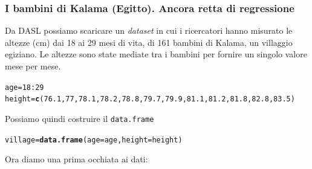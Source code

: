 \documentclass[onecolumn,12pt]{book}\usepackage[]{graphicx}\usepackage[]{color}
\makeatletter
\newcommand{\hlnum}[1]{\textcolor[rgb]{0.686,0.059,0.569}{#1}}%
\newcommand{\hlopt}[1]{\textcolor[rgb]{0,0,0}{#1}}%
\newcommand{\hlstd}[1]{\textcolor[rgb]{0.345,0.345,0.345}{#1}}%
\newcommand{\hlkwb}[1]{\textcolor[rgb]{0.69,0.353,0.396}{#1}}%
\newcommand{\hlkwc}[1]{\textcolor[rgb]{0.333,0.667,0.333}{#1}}%
\newcommand{\hlkwd}[1]{\textcolor[rgb]{0.737,0.353,0.396}{\textbf{#1}}}%
\newenvironment{kframe}{%
 \def\at@end@of@kframe{}%
 \ifinner\ifhmode%
  \def\at@end@of@kframe{\end{minipage}}%
  \begin{minipage}{\columnwidth}%
 \fi\fi%
 \def\FrameCommand##1{\hskip\@totalleftmargin \hskip-\fboxsep
 \colorbox{shadecolor}{##1}\hskip-\fboxsep
     \hskip-\linewidth \hskip-\@totalleftmargin \hskip\columnwidth}%
 \MakeFramed {\advance\hsize-\width
   \@totalleftmargin\z@ \linewidth\hsize
   \@setminipage}}%
 {\par\unskip\endMakeFramed%
 \at@end@of@kframe}
\newenvironment{knitrout}{}{} %
\makeatother
\begin{document}
\subsubsection{I bambini di Kalama (Egitto). Ancora retta di regressione}
Da DASL \cite{DASL} possiamo scaricare un \emph{dataset} in cui i ricercatori hanno misurato le altezze (cm) dai 18 ai 29 mesi di vita, di 161 bambini di Kalama, un villaggio egiziano. Le altezze sono state mediate tra i bambini per fornire un singolo valore mese per mese.
\begin{knitrout}
\color{fgcolor}\begin{kframe}
\begin{alltt}
\hlstd{age}\hlkwb{=}\hlnum{18}\hlopt{:}\hlnum{29}
\hlstd{height}\hlkwb{=}\hlkwd{c}\hlstd{(}\hlnum{76.1}\hlstd{,}\hlnum{77}\hlstd{,}\hlnum{78.1}\hlstd{,}\hlnum{78.2}\hlstd{,}\hlnum{78.8}\hlstd{,}\hlnum{79.7}\hlstd{,}\hlnum{79.9}\hlstd{,}\hlnum{81.1}\hlstd{,}\hlnum{81.2}\hlstd{,}\hlnum{81.8}\hlstd{,}\hlnum{82.8}\hlstd{,}\hlnum{83.5}\hlstd{)}
\end{alltt}
\end{kframe}
\end{knitrout}
Possiamo quindi costruire il \texttt{data.frame}
\begin{knitrout}
\color{fgcolor}\begin{kframe}
\begin{alltt}
\hlstd{village}\hlkwb{=}\hlkwd{data.frame}\hlstd{(}\hlkwc{age}\hlstd{=age,}\hlkwc{height}\hlstd{=height)}
\end{alltt}
\end{kframe}
\end{knitrout}
Ora diamo una prima occhiata ai dati:
\end{document}
